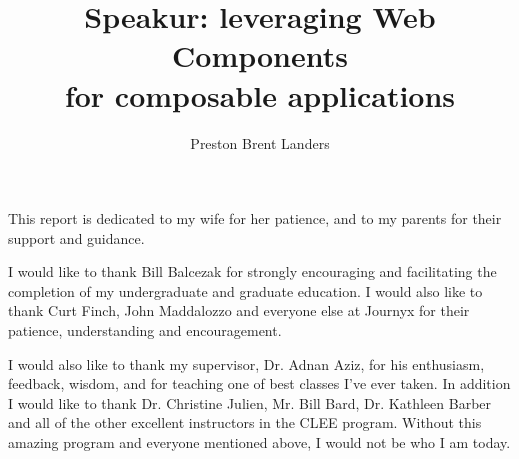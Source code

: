 \documentclass[12pt]{report}	%
\author{Preston Brent Landers}  	%
\title{Speakur: leveraging Web Components \\ for composable applications}
\theoremstyle{definition}
\theoremstyle{remark}
\begin{document}
\copyrightpage          %


%
%
%
\commcertpage           %

\titlepage              %



%
\begin{dedication}
%
This report is dedicated to my wife for her patience,\linebreak
and to my parents for their support and guidance.
\end{dedication}


\begin{acknowledgments}		%
%
I would like to thank Bill Balcezak for strongly encouraging and facilitating the completion of my undergraduate and graduate education. 
I would also like to thank Curt Finch, John Maddalozzo and everyone else at Journyx for their patience, understanding and encouragement.

I would also like to thank my supervisor, Dr. Adnan Aziz, 
for his enthusiasm, feedback, wisdom, and for teaching one of best classes I've ever taken.
In addition I would like to thank Dr. Christine Julien, Mr. Bill Bard, Dr. Kathleen Barber and all of the other excellent instructors in the CLEE program.
Without this amazing program and everyone mentioned above, I would not be who I am today.
\end{acknowledgments}


%
\utabstract
{}%
\indent
\end{document}
